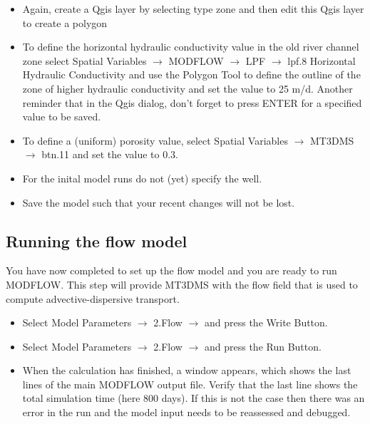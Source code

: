 \begin{itemize}

\item Again, create a Qgis layer by selecting type zone and then edit this Qgis layer to create a polygon

\item To define the horizontal hydraulic conductivity value in the old river channel zone
select {\color{blue}Spatial Variables} $\rightarrow$ {\color{blue}MODFLOW} $\rightarrow$ 
{\color{blue}LPF} $\rightarrow$ {\color{blue}lpf.8 Horizontal Hydraulic Conductivity} 
and use the {\color{blue}Polygon Tool} to define the outline of the zone of higher 
hydraulic conductivity and set the value to 25 m/d. Another reminder that in the Qgis dialog, 
don't forget to press ENTER for a specified value to be saved.
 

\item To define a (uniform) porosity value, select {\color{blue}Spatial Variables} 
$\rightarrow$ {\color{blue}MT3DMS} $\rightarrow$ {\color{blue}btn.11} 
and set the value to 0.3. 

\item For the inital model runs do not (yet) specify the well.

\item Save the model such that your recent changes will not be lost.

\end{itemize}



\subsection{Running the flow model}

You have now completed to set up the flow model and you are ready to run MODFLOW.
This step will provide MT3DMS with the flow field that is used to compute 
advective-dispersive transport.

\begin{itemize}

\item Select {\color{blue}Model Parameters} $\rightarrow$ {\color{blue}2.Flow} $\rightarrow$ and press 
the {\color{blue}Write Button}.

\item Select {\color{blue}Model Parameters} $\rightarrow$ {\color{blue}2.Flow} $\rightarrow$ and press
the {\color{blue}Run Button}.

\item When the calculation has finished, a window appears, which shows the last lines of the 
main MODFLOW output file. Verify that the last line shows the total simulation time (here 800 days).  
If this is not the case then there was an error in the run and the model input needs to be reassessed and debugged.


\end{itemize}

